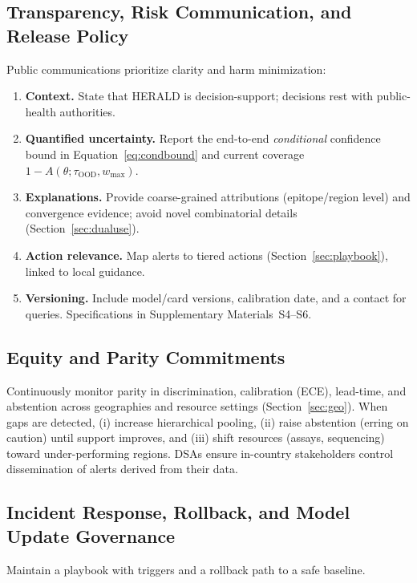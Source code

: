 \documentclass[11pt]{article}
\begin{document}
\subsection{Transparency, Risk Communication, and Release Policy}
\label{sec:comm}
Public communications prioritize clarity and harm minimization:
\begin{enumerate}[leftmargin=*, itemsep=2pt, topsep=2pt]
\item \textbf{Context.} State that HERALD is decision-support; decisions rest with public-health authorities.
\item \textbf{Quantified uncertainty.} Report the end-to-end \emph{conditional} confidence bound in Equation~\eqref{eq:condbound} and current coverage $1-A(\theta;\tau_{\text{OOD}},w_{\max})$.
\item \textbf{Explanations.} Provide coarse-grained attributions (epitope/region level) and convergence evidence; avoid novel combinatorial details (Section~\ref{sec:dualuse}).
\item \textbf{Action relevance.} Map alerts to tiered actions (Section~\ref{sec:playbook}), linked to local guidance.
\item \textbf{Versioning.} Include model/card versions, calibration date, and a contact for queries. Specifications in Supplementary Materials~S4--S6.
\end{enumerate}

\subsection{Equity and Parity Commitments}
\label{sec:equity}
Continuously monitor parity in discrimination, calibration (ECE), lead-time, and abstention across geographies and resource settings (Section~\ref{sec:geo}). When gaps are detected, (i) increase hierarchical pooling, (ii) raise abstention (erring on caution) until support improves, and (iii) shift resources (assays, sequencing) toward under-performing regions. DSAs ensure in-country stakeholders control dissemination of alerts derived from their data.

\subsection{Incident Response, Rollback, and Model Update Governance}
\label{sec:incident}
Maintain a playbook with triggers and a rollback path to a safe baseline.
\end{document}

